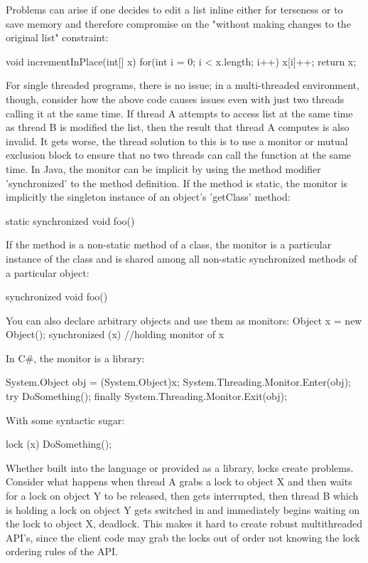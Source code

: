 Problems can arise if one decides to edit a list inline either for terseness or to save memory and therefore compromise on the 
"without making changes to the original list" constraint: 

void incrementInPlace(int[] x) {
	for(int i = 0; i < x.length; i++) { 
	  x[i]++;
         }
         return x;
}

For single threaded programs, there is no issue; in a multi-threaded environment, though, consider how the above code
causes issues even with just two threads calling it at the same time. If thread A attempts to access list at the same time as thread B is modified the list, then the result
that thread A computes is also invalid. It gets worse, the thread solution to this is to use a monitor or mutual exclusion block to ensure that no two threads can call the function at the
same time. In Java, the monitor can be implicit by using the method modifier 'synchronized' to the method definition. If the method is static,
the monitor is implicitly the singleton instance of an object's 'getClass' method:

static synchronized void foo() { }

If the method is a non-static method of a class, the monitor is a 
particular instance of the class and is shared among all non-static synchronized methods of a particular object:

synchronized void foo() { }

You can also declare arbitrary objects and use them as monitors:
Object x = new Object();
synchronized (x) {
 //holding monitor of x
}

In C\#, the monitor is a library:
 
System.Object obj = (System.Object)x;
System.Threading.Monitor.Enter(obj);
try
{
    DoSomething();
}
finally
{
    System.Threading.Monitor.Exit(obj);
} 

With some syntactic sugar:

lock (x)
{
    DoSomething();
}

Whether built into the language or provided as a library, locks create problems\cite{problemsWithThreads}.
Consider what happens when thread A grabs a lock to object X and then waits for
a lock on object Y to be released, then gets interrupted, then thread B which is holding a lock
on object Y gets switched in and immediately begins waiting on the lock to object X, deadlock.
This makes it hard to create robust multithreaded API's, since the client code may grab the locks out of order not
knowing the lock ordering rules of the API. 

